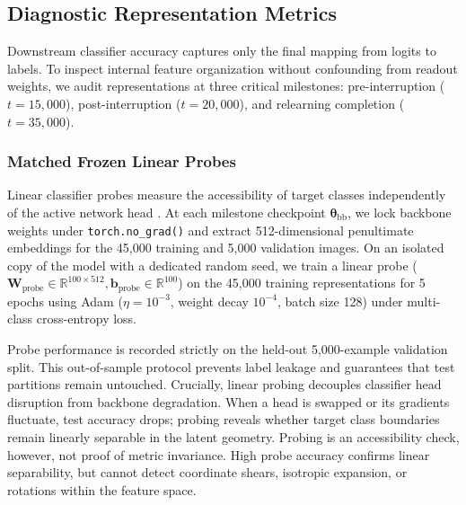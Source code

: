 \documentclass[sn-mathphys,Numbered]{sn-jnl}
\begin{document}
\subsection{Diagnostic Representation Metrics}\label{subsec:protocol_diagnostics}

Downstream classifier accuracy captures only the final mapping from logits to labels. To inspect internal feature organization without confounding from readout weights, we audit representations at three critical milestones: pre-interruption ($t = 15{,}000$), post-interruption ($t = 20{,}000$), and relearning completion ($t = 35{,}000$).

\subsubsection{Matched Frozen Linear Probes}\label{subsubsec:protocol_probes}
Linear classifier probes measure the accessibility of target classes independently of the active network head \cite{alain2017understanding,davari2022probing}. At each milestone checkpoint $\bm{\theta}_{\mathrm{bb}}$, we lock backbone weights under \texttt{torch.no\_grad()} and extract 512-dimensional penultimate embeddings for the 45{,}000 training and 5{,}000 validation images. On an isolated copy of the model with a dedicated random seed, we train a linear probe ($\bm{W}_{\mathrm{probe}} \in \mathbb{R}^{100 \times 512}, \bm{b}_{\mathrm{probe}} \in \mathbb{R}^{100}$) on the 45{,}000 training representations for 5 epochs using Adam ($\eta = 10^{-3}$, weight decay $10^{-4}$, batch size 128) under multi-class cross-entropy loss.

Probe performance is recorded strictly on the held-out 5{,}000-example validation split. This out-of-sample protocol prevents label leakage and guarantees that test partitions remain untouched. Crucially, linear probing decouples classifier head disruption from backbone degradation. When a head is swapped or its gradients fluctuate, test accuracy drops; probing reveals whether target class boundaries remain linearly separable in the latent geometry. Probing is an accessibility check, however, not proof of metric invariance. High probe accuracy confirms linear separability, but cannot detect coordinate shears, isotropic expansion, or rotations within the feature space.
\end{document}
